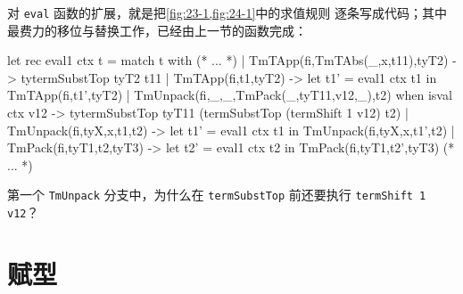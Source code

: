 对 \texttt{eval} 函数的扩展，就是把\cref{fig:23-1,fig:24-1}中的求值规则
逐条写成代码；其中最费力的移位与替换工作，已经由上一节的函数完成：
\begin{taplocamlcode}
let rec eval1 ctx t = match t with
    (* ... *)
  | TmTApp(fi,TmTAbs(_,x,t11),tyT2) ->
      tytermSubstTop tyT2 t11
  | TmTApp(fi,t1,tyT2) ->
      let t1' = eval1 ctx t1 in
      TmTApp(fi,t1',tyT2)
  | TmUnpack(fi,_,_,TmPack(_,tyT11,v12,_),t2)
      when isval ctx v12 ->
      tytermSubstTop tyT11
        (termSubstTop (termShift 1 v12) t2)
  | TmUnpack(fi,tyX,x,t1,t2) ->
      let t1' = eval1 ctx t1 in
      TmUnpack(fi,tyX,x,t1',t2)
  | TmPack(fi,tyT1,t2,tyT3) ->
      let t2' = eval1 ctx t2 in
      TmPack(fi,tyT1,t2',tyT3)
    (* ... *)
\end{taplocamlcode}

\begin{exercise}[\(\star\)]
\label{ex:25.4.1}
第一个 \texttt{TmUnpack} 分支中，为什么在
\texttt{termSubstTop} 前还要执行 \texttt{termShift 1 v12}？
\end{exercise}

\section{赋型}
\label{sec:25.5}

